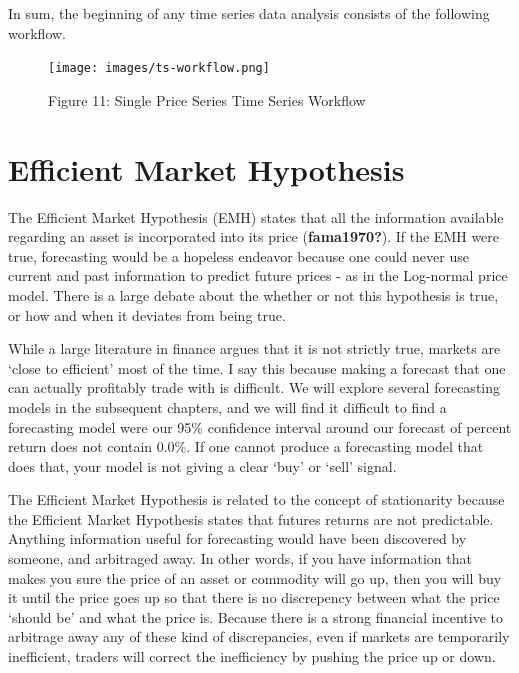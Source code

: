 \documentclass[
  letterpaper,
  DIV=11,
  numbers=noendperiod]{scrreprt}
\begin{document}
In sum, the beginning of any time series data analysis consists of the
following workflow.

\begin{figure}

{\centering \texttt{[image: images/ts-workflow.png]}

}

\caption{Figure 11: Single Price Series Time Series Workflow}

\end{figure}

\hypertarget{efficient-market-hypothesis}{%
\section{Efficient Market
Hypothesis}\label{efficient-market-hypothesis}}

The Efficient Market Hypothesis (EMH) states that all the information
available regarding an asset is incorporated into its price
(\textbf{fama1970?}). If the EMH were true, forecasting would be a
hopeless endeavor because one could never use current and past
information to predict future prices - as in the Log-normal price model.
There is a large debate about the whether or not this hypothesis is
true, or how and when it deviates from being true.

While a large literature in finance argues that it is not strictly true,
markets are `close to efficient' most of the time. I say this because
making a forecast that one can actually profitably trade with is
difficult. We will explore several forecasting models in the subsequent
chapters, and we will find it difficult to find a forecasting model were
our 95\% confidence interval around our forecast of percent return does
not contain 0.0\%. If one cannot produce a forecasting model that does
that, your model is not giving a clear `buy' or `sell' signal.

The Efficient Market Hypothesis is related to the concept of
stationarity because the Efficient Market Hypothesis states that futures
returns are not predictable. Anything information useful for forecasting
would have been discovered by someone, and arbitraged away. In other
words, if you have information that makes you sure the price of an asset
or commodity will go up, then you will buy it until the price goes up so
that there is no discrepency between what the price `should be' and what
the price is. Because there is a strong financial incentive to arbitrage
away any of these kind of discrepancies, even if markets are temporarily
inefficient, traders will correct the inefficiency by pushing the price
up or down.
\end{document}
